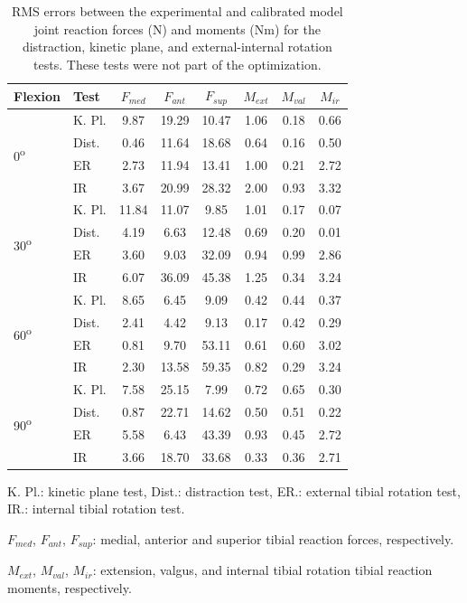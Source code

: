\begin{table}
    \caption{RMS errors between the experimental and calibrated model joint reaction forces (N) and moments (Nm) for the distraction, kinetic plane, and external-internal rotation tests. These tests were not part of the optimization.}
    \label{tab:distResults}
    \setlength{\tabcolsep}{10pt}
    \begin{tabular}{ l l c c c c c c } \hline
        \textbf{Flexion} & \textbf{Test} & $F_{med}$ & $F_{ant}$ & $F_{sup}$ & $M_{ext}$ & $M_{val}$ & $M_{ir}$\\ \hline
        \multirow{4}{*}{0\textsuperscript{o}}& K. Pl. & 9.87 & 19.29 & 10.47 & 1.06 & 0.18 & 0.66\\
        & Dist. & 0.46 & 11.64 & 18.68 & 0.64 & 0.16 & 0.50\\
        & ER  & 2.73 & 11.94 & 13.41 & 1.00 & 0.21 & 2.72\\
        & IR  & 3.67 & 20.99 & 28.32 & 2.00 & 0.93 & 3.32\\
        \hline 
        \multirow{4}{*}{30\textsuperscript{o}}& K. Pl. & 11.84 & 11.07 & 9.85 & 1.01 & 0.17 & 0.07\\
        & Dist. & 4.19 & 6.63 & 12.48 & 0.69 & 0.20 & 0.01\\
        & ER  & 3.60 & 9.03 & 32.09 & 0.94 & 0.99 & 2.86\\
        & IR  & 6.07 & 36.09 & 45.38 & 1.25 & 0.34 & 3.24\\
        \hline 
        \multirow{4}{*}{60\textsuperscript{o}}& K. Pl. & 8.65 & 6.45 & 9.09 & 0.42 & 0.44 & 0.37\\
        & Dist. & 2.41 & 4.42 & 9.13 & 0.17 & 0.42 & 0.29\\
        & ER  & 0.81 & 9.70 & 53.11 & 0.61 & 0.60 & 3.02\\
        & IR  & 2.30 & 13.58 & 59.35 & 0.82 & 0.29 & 3.24\\
        \hline 
        \multirow{4}{*}{90\textsuperscript{o}}& K. Pl. & 7.58 & 25.15 & 7.99 & 0.72 & 0.65 & 0.30\\
        & Dist. & 0.87 & 22.71 & 14.62 & 0.50 & 0.51 & 0.22\\
        & ER  & 5.58 & 6.43 & 43.39 & 0.93 & 0.45 & 2.72\\
        & IR  & 3.66 & 18.70 & 33.68 & 0.33 & 0.36 & 2.71\\
        \hline 
        \end{tabular}
    \begin{tablenotes}
        \small
        \item K. Pl.: kinetic plane test, Dist.: distraction test, ER.: external tibial rotation test, IR.: internal tibial rotation test.
        \item $F_{med}$, $F_{ant}$, $F_{sup}$: medial, anterior and superior tibial reaction forces, respectively.
        \item $M_{ext}$, $M_{val}$, $M_{ir}$: extension, valgus, and internal tibial rotation tibial reaction moments, respectively.
    \end{tablenotes}
\end{table}